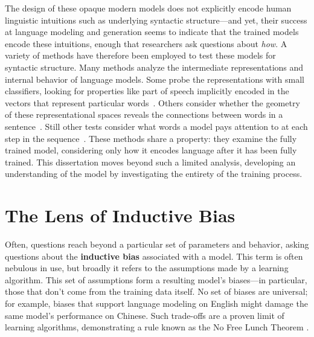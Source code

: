 The design of these opaque modern models does not explicitly encode human linguistic intuitions such as underlying syntactic structure---and yet, their success at language modeling and generation seems to indicate that the trained models encode these intuitions, enough that researchers ask questions about \textit{how}. A variety of methods have therefore been employed to test these models for syntactic structure. Many methods analyze the intermediate representations and internal behavior of language models. Some probe the representations with small classifiers, looking for properties like part of speech implicitly encoded in the vectors that represent particular words~\citep{belinkov_what_2017,voita_information-theoretic_2020}. Others consider whether the geometry of these representational spaces reveals the connections between words in a sentence~\citep{hewitt_structural_2019}. Still other tests consider what words a model pays attention to at each step in the sequence~\citep{voita_analyzing_2019,clark_what_2019}. These methods share a property: they examine the fully trained model, considering only how it encodes language after it has been fully trained. This dissertation moves beyond such a limited analysis, developing an understanding of the model by investigating the entirety of the training process.

\section{The Lens of Inductive Bias}

Often, questions reach beyond a particular set of parameters and behavior, asking questions about the \textbf{inductive bias} associated with a model. This term is often nebulous in use, but broadly it refers to the assumptions made by a learning algorithm. This set of assumptions form a resulting model's biases---in particular, those that don't come from the training data itself. No set of biases are universal; for example, biases that support language modeling on English might damage the same model's performance on Chinese. Such trade-offs are a proven limit of learning algorithms, demonstrating a rule known as the No Free Lunch Theorem \citep{Wolpert1997NoFL}.


